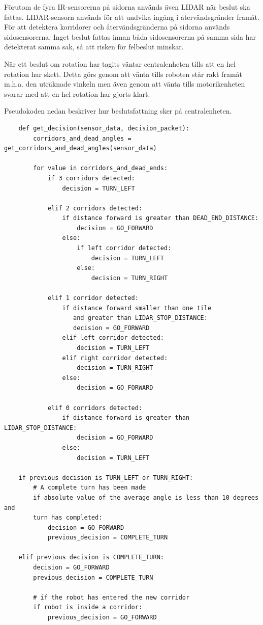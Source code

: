 \documentclass[a4paper,titlepage,12pt]{article}
\begin{document}
    Förutom de fyra IR-sensorerna på sidorna används även LIDAR när beslut ska fattas. 
    LIDAR-sensorn används för att undvika ingång i återvändsgränder framåt. 
    För att detektera korridorer och återvändsgränderna på sidorna används
    sidosensorerna. Inget beslut fattas innan båda sidosensorerna på samma sida
    har detekterat samma sak, så att risken för felbeslut minskar.

    När ett beslut om rotation har tagits väntar centralenheten tills att en hel
    rotation har skett. Detta görs genom att vänta tills roboten står rakt framåt m.h.a.
    den uträknade vinkeln men även genom att vänta tills motorikenheten svarar
    med att en hel rotation har gjorts klart.  

    Pseudokoden nedan beskriver hur beslutsfattning sker på centralenheten.
    
    \begin{lstlisting}
    def get_decision(sensor_data, decision_packet):
        corridors_and_dead_angles = get_corridors_and_dead_angles(sensor_data)

        for value in corridors_and_dead_ends:
            if 3 corridors detected:
                decision = TURN_LEFT
            
            elif 2 corridors detected:
                if distance forward is greater than DEAD_END_DISTANCE:
                    decision = GO_FORWARD
                else:
                    if left corridor detected:
                        decision = TURN_LEFT
                    else:
                        decision = TURN_RIGHT
            
            elif 1 corridor detected:
                if distance forward smaller than one tile 
                   and greater than LIDAR_STOP_DISTANCE:
                   decision = GO_FORWARD
                elif left corridor detected:
                    decision = TURN_LEFT
                elif right corridor detected:
                    decision = TURN_RIGHT
                else:
                    decision = GO_FORWARD

            elif 0 corridors detected:
                if distance forward is greater than LIDAR_STOP_DISTANCE:
                    decision = GO_FORWARD
                else:
                    decision = TURN_LEFT
    
    if previous decision is TURN_LEFT or TURN_RIGHT:
        # A complete turn has been made
        if absolute value of the average angle is less than 10 degrees and
        turn has completed:
            decision = GO_FORWARD
            previous_decision = COMPLETE_TURN

    elif previous decision is COMPLETE_TURN:
        decision = GO_FORWARD
        previous_decision = COMPLETE_TURN
        
        # if the robot has entered the new corridor
        if robot is inside a corridor:
            previous_decision = GO_FORWARD
        
    \end{lstlisting}
    
\end{document}
